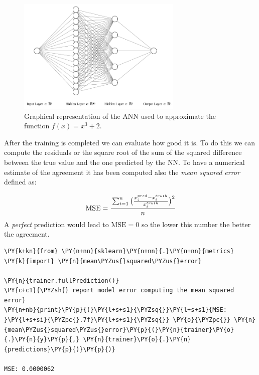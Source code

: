 \begin{figure}[htb]
	\centering
	\includegraphics[width=0.7\textwidth]{figures/ann_1.png}
	\caption{Graphical representation of the ANN used to approximate the function $f(x) = x^3 + 2$.}
        \label{fig:ann_1}
\end{figure}

After the training is completed we can evaluate how good it is. To do
this we can compute the residuals or the square root of the sum of the
squared difference between the true value and the one predicted by the
NN. To have a numerical estimate of the agreement it has been computed also the
\emph{mean squared error} defined as:

\begin{equation}\textrm{MSE} = \cfrac{\sum_{i=1}^n{\big(\frac{x_{i}^{pred} - x_i^{truth}}{x_i^{truth}}\big)^2}}{n}\end{equation}
A \emph{perfect} prediction would lead to \(\textrm{MSE}=0\) so the
lower this number the better the agreement.

\begin{codebox}[breakable, size=fbox, boxrule=1pt, pad at break*=1mm,colback=cellbackground, colframe=cellborder]
\begin{Verbatim}[commandchars=\\\{\}]
\PY{k+kn}{from} \PY{n+nn}{sklearn}\PY{n+nn}{.}\PY{n+nn}{metrics} \PY{k}{import} \PY{n}{mean\PYZus{}squared\PYZus{}error}
	
\PY{n}{trainer.fullPrediction()}
\PY{c+c1}{\PYZsh{} report model error computing the mean squared error}
\PY{n+nb}{print}\PY{p}{(}\PY{l+s+s1}{\PYZsq{}}\PY{l+s+s1}{MSE: }\PY{l+s+si}{\PYZpc{}.7f}\PY{l+s+s1}{\PYZsq{}} \PY{o}{\PYZpc{}} \PY{n}{mean\PYZus{}squared\PYZus{}error}\PY{p}{(}\PY{n}{trainer}\PY{o}{.}\PY{n}{y}\PY{p}{,} \PY{n}{trainer}\PY{o}{.}\PY{n}{predictions}\PY{p}{)}\PY{p}{)}

MSE: 0.0000062
\end{Verbatim}
\end{codebox}

